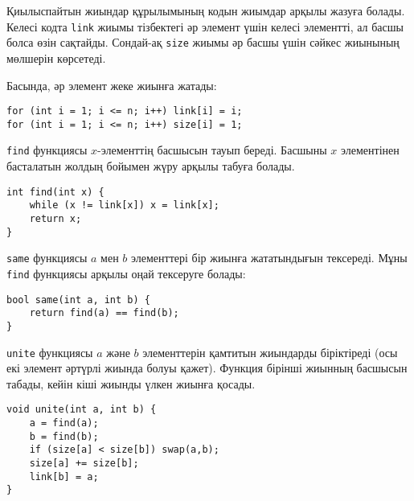 Қиылыспайтын жиындар құрылымының кодын жиымдар арқылы
жазуға болады. Келесі кодта \texttt{link} жиымы
тізбектегі әр элемент үшін келесі элементті, ал
басшы болса өзін сақтайды. Сондай-ақ \texttt{size} жиымы
әр басшы үшін сәйкес жиынының мөлшерін көрсетеді.


Басында, әр элемент жеке жиынға жатады:
\begin{lstlisting}
for (int i = 1; i <= n; i++) link[i] = i;
for (int i = 1; i <= n; i++) size[i] = 1;
\end{lstlisting}

\texttt{find} функциясы $x$-элементтің
басшысын тауып береді.
Басшыны $x$ элементінен басталатын жолдың 
бойымен жүру арқылы табуға болады.

\begin{lstlisting}
int find(int x) {
    while (x != link[x]) x = link[x];
    return x;
}
\end{lstlisting}

\texttt{same} функциясы $a$ мен $b$ элементтері бір 
жиынға жататындығын тексереді. Мұны \texttt{find}
функциясы арқылы оңай тексеруге болады:

\begin{lstlisting}
bool same(int a, int b) {
    return find(a) == find(b);
}
\end{lstlisting}

\begin{samepage}
\texttt{unite} функциясы $a$ және $b$ элементтерін
қамтитын жиындарды біріктіреді (осы екі элемент әртүрлі
жиында болуы қажет). Функция бірінші жиынның басшысын табады,
кейін кіші жиынды үлкен жиынға қосады.

\begin{lstlisting}
void unite(int a, int b) {
    a = find(a);
    b = find(b);
    if (size[a] < size[b]) swap(a,b);
    size[a] += size[b];
    link[b] = a;
}
\end{lstlisting}
\end{samepage}

